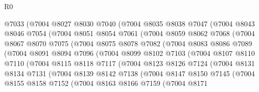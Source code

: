 \begin{lexlean}{R0}
\begin{coremodule}
          @7033
          (@7004
            @8027
            @8030
            @7040
            (@7004
              @8035
              @8038
              @7047
              (@7004
                @8043
                @8046
                @7054
                (@7004
                  @8051
                  @8054
                  @7061
                  (@7004
                    @8059
                    @8062
                    @7068
                    (@7004
                      @8067
                      @8070
                      @7075
                      (@7004
                        @8075
                        @8078
                        @7082
                        (@7004
                          @8083
                          @8086
                          @7089
                          (@7004
                            @8091
                            @8094
                            @7096
                            (@7004
                              @8099
                              @8102
                              @7103
                              (@7004
                                @8107
                                @8110
                                @7110
                                (@7004
                                  @8115
                                  @8118
                                  @7117
                                  (@7004
                                    @8123
                                    @8126
                                    @7124
                                    (@7004
                                      @8131
                                      @8134
                                      @7131
                                      (@7004
                                        @8139
                                        @8142
                                        @7138
                                        (@7004
                                          @8147
                                          @8150
                                          @7145
                                          (@7004
                                            @8155
                                            @8158
                                            @7152
                                            (@7004
                                              @8163
                                              @8166
                                              @7159
                                              (@7004
                                                @8171

\end{coremodule}
\end{lexlean}
